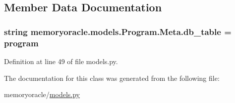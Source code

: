 \subsection{Member Data Documentation}
\hypertarget{classmemoryoracle_1_1models_1_1Program_1_1Meta_ada964e27ebbdc3cb9d5cb7ae8fd2d06c}{}
\subsubsection[{db\+\_\+table}]{\setlength{\rightskip}{0pt plus 5cm}string memoryoracle.\+models.\+Program.\+Meta.\+db\+\_\+table = \textquotesingle{}program\textquotesingle{}\hspace{0.3cm}{\ttfamily [static]}}\label{classmemoryoracle_1_1models_1_1Program_1_1Meta_ada964e27ebbdc3cb9d5cb7ae8fd2d06c}


Definition at line 49 of file models.\+py.



The documentation for this class was generated from the following file\+:\begin{DoxyCompactItemize}
\item 
memoryoracle/\hyperlink{models_8py}{models.\+py}\end{DoxyCompactItemize}
